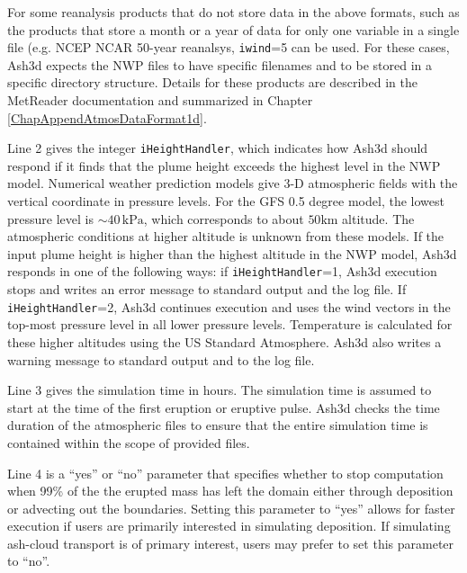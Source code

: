 For some reanalysis products that do not store data in the above formats, such as
the products that store a month or a year of data for only one variable in a single
file (e.g. NCEP NCAR 50-year reanalsys, \texttt{iwind}=5 can be used. For these cases,
Ash3d expects the NWP files to have specific filenames and to be stored in a
specific directory structure. Details for these products are described in the MetReader
documentation and summarized in Chapter \ref{ChapAppendAtmosDataFormat1d}.

Line 2 gives the integer \texttt{iHeightHandler}, which indicates how Ash3d should respond
if it finds that the plume height exceeds the highest level in the NWP model.
Numerical weather prediction models give 3-D atmospheric fields with the vertical coordinate
in pressure levels. For the GFS 0.5 degree model, the lowest pressure level is
$\sim 40 \,\mathrm{kPa}$,
which corresponds to about $50 \mathrm{km}$ altitude.
The atmospheric conditions at higher altitude is
unknown from these models. If the input plume height is higher than the highest
altitude in the NWP model, Ash3d responds in one of the following ways: if
\texttt{iHeightHandler}=1, Ash3d execution stops and writes an error message to standard output
and the log file.
If \texttt{iHeightHandler}=2, Ash3d continues execution and uses the wind vectors in the
top-most pressure level in all lower pressure levels. Temperature is calculated for these
higher altitudes using the US Standard Atmosphere. Ash3d also writes a warning
message to standard output and to the log file.

Line 3 gives the simulation time in hours. The simulation time is assumed to start
at the time of the first eruption or eruptive pulse. Ash3d checks the time duration
of the atmospheric files to ensure that the entire simulation time is contained within
the scope of provided files.

Line 4 is a ``yes'' or ``no'' parameter that specifies whether to stop computation
when 99\% of the the erupted mass has left the domain either through deposition or
advecting out the boundaries. Setting this parameter to ``yes''
allows for faster execution if users are primarily interested in simulating
deposition. If simulating ash-cloud transport is of primary interest, users may
prefer to set this parameter to ``no''.

